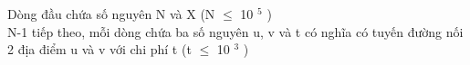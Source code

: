 Dòng đầu chứa số nguyên N và X (N  $\le$  10 $^ 5 $ )
\\N-1 tiếp theo, mỗi dòng chứa ba số nguyên u, v và t có nghĩa có tuyến đường nối 2 địa điểm u và v với chi phí t (t  $\le$  10 $^ 3 $ )
\\ 